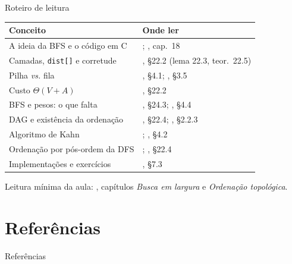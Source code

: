\documentclass[aspectratio=169]{beamer}
\begin{document}
\begin{frame}{Roteiro de leitura}
  \begin{center}
  {\scriptsize
  \begin{tabular}{ll}
    \toprule
    \textbf{Conceito} & \textbf{Onde ler} \\
    \midrule
    A ideia da BFS e o código em C     & \cite{feofiloff2020algoritmos}; \cite{sedgewick2002algorithms}, cap.~18 \\
    Camadas, \texttt{dist[]} e corretude & \cite{cormen2009introduction}, §22.2 (lema 22.3, teor.~22.5) \\
    Pilha \emph{vs.} fila              & \cite{sedgewick2011algorithms}, §4.1; \cite{levitin2012introduction}, §3.5 \\
    Custo $\Theta(V+A)$                & \cite{cormen2009introduction}, §22.2 \\
    BFS e pesos: o que falta           & \cite{cormen2009introduction}, §24.3; \cite{sedgewick2011algorithms}, §4.4 \\
    DAG e existência da ordenação      & \cite{cormen2009introduction}, §22.4; \cite{knuth1997art}, §2.2.3 \\
    Algoritmo de Kahn                  & \cite{kahn1962topological}; \cite{sedgewick2011algorithms}, §4.2 \\
    Ordenação por pós-ordem da DFS     & \cite{feofiloff2020algoritmos}; \cite{cormen2009introduction}, §22.4 \\
    Implementações e exercícios        & \cite{ziviani2011projeto}, §7.3 \\
    \bottomrule
  \end{tabular}}
  \end{center}
  {\scriptsize Leitura mínima da aula: \cite{feofiloff2020algoritmos},
  capítulos \emph{Busca em largura} e \emph{Ordenação topológica}.}
\end{frame}

\section*{Referências}
\begin{frame}[allowframebreaks]{Referências}
  \scriptsize
  \nocite{*}
  
  
\end{frame}
\end{document}

